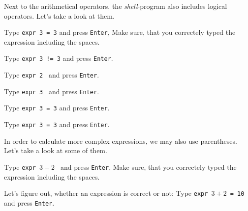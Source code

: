 \begin{challenge}
    \begin{task}
        Next to the arithmetical operators, the \textit{shell}-program also includes logical operators.
        Let's take a look at them.
        \begin{questions}
            \item Type \texttt{expr 3 = 3} and press \texttt{Enter}, Make sure, that you correctely typed the expression including the spaces.
            \item Type \texttt{expr 3 != 3} and press \texttt{Enter}.
            \item Type \texttt{expr 2 } and press \texttt{Enter}.
            \item Type \texttt{expr 3 } and press \texttt{Enter}.
            \item Type \texttt{expr 3 \>= 3} and press \texttt{Enter}.
            \item Type \texttt{expr 3 \<= 3} and press \texttt{Enter}.
        \end{questions}
    \end{task}

    \begin{task}
        In order to calculate more complex expressions, we may also use parentheses.
        Let's take a look at some of them.
        \begin{questions}
            \item Type \texttt{expr \( 3 + 2 \) } and press \texttt{Enter}, Make sure, that you correctely typed the expression including the spaces.
            \item Let's figure out, whether an expression is correct or not: Type \texttt{expr \( 3 + 2 \)  = 10} and press \texttt{Enter}.
        \end{questions}
    \end{task}


\end{challenge}
